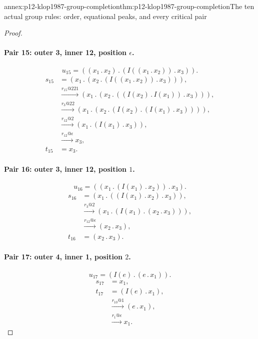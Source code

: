 \begin{annexitem}{annex:p12-klop1987-group-completion}{thm:p12-klop1987-group-completion}{The ten actual group rules: order, equational peaks, and every critical pair}
\begin{proof}
\paragraph{Pair 15: outer 3, inner 12, position \(\epsilon\).}
\[
 u_{15}=((x_{1}\mathbin{.}x_{2})\mathbin{.}(I((x_{1}\mathbin{.}x_{2}))\mathbin{.}x_{3})).
\]
\begin{align*}
 s_{15}&=(x_{1}\mathbin{.}(x_{2}\mathbin{.}(I((x_{1}\mathbin{.}x_{2}))\mathbin{.}x_{3}))),\\
 &\xrightarrow{r_{15}@221}(x_{1}\mathbin{.}(x_{2}\mathbin{.}((I(x_{2})\mathbin{.}I(x_{1}))\mathbin{.}x_{3}))),\\
 &\xrightarrow{r_{3}@22}(x_{1}\mathbin{.}(x_{2}\mathbin{.}(I(x_{2})\mathbin{.}(I(x_{1})\mathbin{.}x_{3})))),\\
 &\xrightarrow{r_{12}@2}(x_{1}\mathbin{.}(I(x_{1})\mathbin{.}x_{3})),\\
 &\xrightarrow{r_{12}@\epsilon}x_{3},\\
 t_{15}&=x_{3}.
\end{align*}

\paragraph{Pair 16: outer 3, inner 12, position \(1\).}
\[
 u_{16}=((x_{1}\mathbin{.}(I(x_{1})\mathbin{.}x_{2}))\mathbin{.}x_{3}).
\]
\begin{align*}
 s_{16}&=(x_{1}\mathbin{.}((I(x_{1})\mathbin{.}x_{2})\mathbin{.}x_{3})),\\
 &\xrightarrow{r_{3}@2}(x_{1}\mathbin{.}(I(x_{1})\mathbin{.}(x_{2}\mathbin{.}x_{3}))),\\
 &\xrightarrow{r_{12}@\epsilon}(x_{2}\mathbin{.}x_{3}),\\
 t_{16}&=(x_{2}\mathbin{.}x_{3}).
\end{align*}

\paragraph{Pair 17: outer 4, inner 1, position \(2\).}
\[
 u_{17}=(I(e)\mathbin{.}(e\mathbin{.}x_{1})).
\]
\begin{align*}
 s_{17}&=x_{1},\\
 t_{17}&=(I(e)\mathbin{.}x_{1}),\\
 &\xrightarrow{r_{10}@1}(e\mathbin{.}x_{1}),\\
 &\xrightarrow{r_{1}@\epsilon}x_{1}.
\end{align*}


\end{proof}
\end{annexitem}
